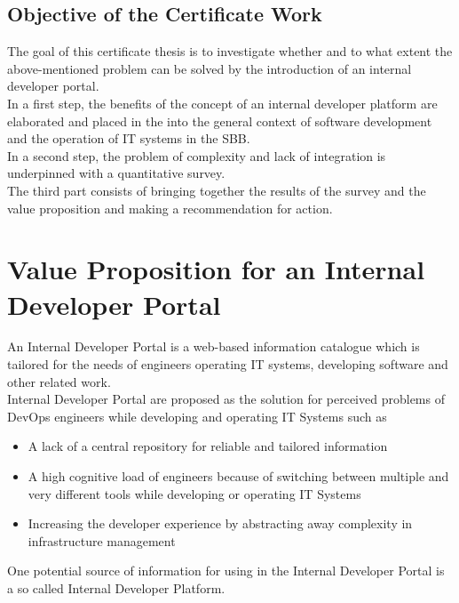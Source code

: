 \documentclass[a4paper,12pt]{article}
\begin{document}
    \subsection{Objective of the Certificate Work}
    \label{subsec:iobjective}
    The goal of this certificate thesis is to investigate whether and to what extent the above-mentioned problem
    can be solved by the introduction of an internal developer portal.\\
    In a first step, the benefits of the concept of an internal developer platform are elaborated and placed in the
    into the general context of software development and the operation of IT systems in the SBB.\\
    In a second step, the problem of complexity and lack of integration is underpinned with a quantitative survey.\\
    The third part consists of bringing together the results of the survey and the value proposition and making a
    recommendation for action.


    \section{Value Proposition for an Internal Developer Portal}
    \label{sec:vp}
    An Internal Developer Portal is a web-based information catalogue which is tailored for the needs of
    engineers operating IT systems, developing software and other related work.\\
    Internal Developer Portal are proposed as the solution for perceived problems\parencite{backstagestory} of DevOps
    engineers while developing and operating IT Systems such as
    \begin{itemize}
        \item A lack of a central repository for reliable and tailored information
        \item A high cognitive load of engineers because of switching between multiple and very different tools while developing or operating IT Systems
        \item Increasing the developer experience by abstracting away complexity in infrastructure management
    \end{itemize}
    One potential source of information for using in the Internal Developer Portal is a so called Internal Developer Platform.
\end{document}
